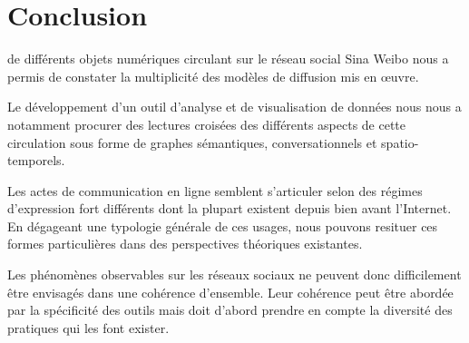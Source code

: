 \chapter*{Conclusion}




 de différents objets numériques circulant sur le réseau social Sina Weibo nous a permis de constater la multiplicité des modèles de diffusion mis en œuvre. 

Le développement d'un outil d'analyse et de visualisation de données nous  nous a notamment procurer des lectures croisées des différents aspects de cette circulation sous forme de graphes sémantiques, conversationnels et spatio-temporels.

Les actes de communication en ligne semblent s'articuler selon des régimes d'expression fort différents dont la plupart existent depuis bien avant l'Internet. En dégageant une typologie générale de ces usages, nous pouvons resituer ces formes particulières dans des perspectives théoriques existantes.

Les phénomènes observables sur les réseaux sociaux ne peuvent donc difficilement être envisagés dans une cohérence d'ensemble. Leur cohérence peut être abordée par la spécificité des outils mais doit d'abord prendre en compte la diversité des pratiques qui les font exister.

